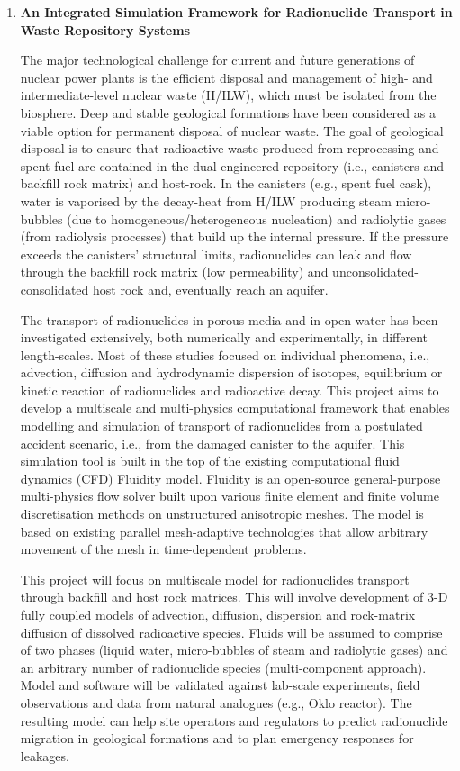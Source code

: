 \documentclass[12pts,a4paper,amsmath,amssymb,floatfix]{article}%
\begin{document}
\begin{enumerate}[label=\bfseries Project: \arabic*:]

\item {\bf An Integrated Simulation Framework for Radionuclide Transport in Waste Repository Systems}


The major technological challenge for current and future generations of nuclear power plants is the efficient disposal and management of high- and intermediate-level nuclear waste (H/ILW), which must be isolated from the biosphere. Deep and stable geological formations have been considered as a viable option for permanent disposal of nuclear waste. The goal of geological disposal is to ensure that radioactive waste produced from reprocessing and spent fuel are contained in the dual engineered repository (i.e., canisters and backfill rock matrix) and host-rock. In the canisters (e.g., spent fuel cask), water is vaporised by the decay-heat from H/ILW producing steam micro-bubbles (due to homogeneous/heterogeneous nucleation) and radiolytic gases (from radiolysis processes) that build up the internal pressure. If the pressure exceeds the canisters' structural limits, radionuclides can leak and flow through the backfill rock matrix (low permeability) and unconsolidated-consolidated host rock and, eventually reach an aquifer.

The transport of radionuclides in porous media and in open water has been investigated extensively, both numerically and experimentally, in different length-scales. Most of these studies focused on individual phenomena, i.e., advection, diffusion and hydrodynamic dispersion of isotopes, equilibrium or kinetic reaction of radionuclides and radioactive decay. This project aims to develop a multiscale and multi-physics computational framework that enables modelling and simulation of transport of radionuclides from a postulated accident scenario, i.e., from the damaged canister to the aquifer. This simulation tool is built in the top of the existing computational fluid dynamics (CFD) Fluidity model.  Fluidity is an open-source general-purpose multi-physics flow solver built upon various finite element and finite volume discretisation methods on unstructured anisotropic meshes. The model is based on existing parallel mesh-adaptive technologies that allow arbitrary movement of the mesh in time-dependent problems.

This project will focus on multiscale model for radionuclides transport through backfill and host rock matrices. This will involve development of 3-D fully coupled models of advection, diffusion, dispersion and rock-matrix diffusion of dissolved radioactive species. Fluids will be assumed to comprise of two phases (liquid water, micro-bubbles of steam and radiolytic gases) and an arbitrary number of radionuclide species (multi-component approach). Model and software will be validated against lab-scale experiments, field observations and data from natural analogues (e.g., Oklo reactor).  The resulting model can help site operators and regulators to predict radionuclide migration in geological formations and to plan emergency responses for leakages.


\end{enumerate}
\end{document}
